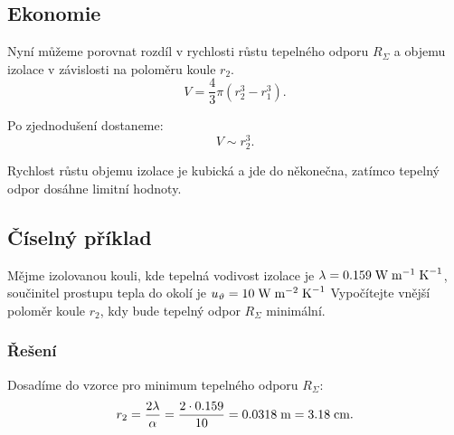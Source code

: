 \documentclass{article}
\begin{document}
\begin{center}
\end{center}


\subsection{Ekonomie}

Nyní můžeme porovnat rozdíl v rychlosti růstu tepelného odporu $R_{\Sigma}$ a objemu izolace v závislosti na poloměru koule $r_2$.
$$
    V = \frac{4}{3} \pi (r_2^3 - r_1^3).
$$

Po zjednodušení dostaneme:
$$
    V \sim r_2^3.
$$

Rychlost růstu objemu izolace je kubická a jde do někonečna, zatímco tepelný odpor dosáhne limitní hodnoty.


\subsection{Číselný příklad}
Mějme izolovanou kouli, kde tepelná vodivost izolace je $\lambda = 0.159 \; \textrm{W} \; \textrm{m}^{-1} \; \textrm{K}^{-1}$, součinitel prostupu tepla do okolí je $u_{\vartheta} = 10 \; \textrm{W} \; \textrm{m}^{-2} \; \textrm{K}^{-1}$ Vypočítejte vnější poloměr koule $r_2$, kdy bude tepelný odpor $R_{\Sigma}$ minimální.

\subsubsection{Řešení}
Dosadíme do vzorce pro minimum tepelného odporu $R_{\Sigma}$:
$$
    r_2 = \frac{2 \lambda}{\alpha} = \frac{2 \cdot 0.159}{10} = 0.0318 \; \textrm{m} = 3.18 \; \textrm{cm}.
$$
\end{document}
